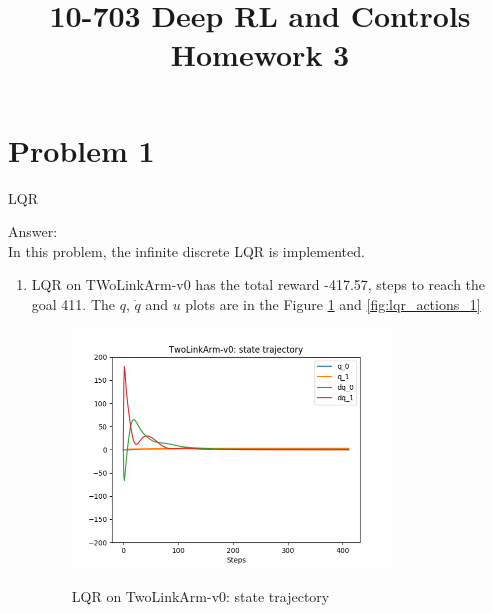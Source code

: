 \documentclass[12pt]{article}
\title{10-703 Deep RL and Controls\\
  Homework 3\\
}
\begin{document}
\maketitle





\section*{Problem 1}
LQR
\begin{tcolorbox}	
	Answer: \\
	In this problem, the infinite discrete LQR is implemented. 
	\begin{enumerate}
	\item
	LQR on TWoLinkArm-v0 has the total reward -417.57, steps to reach the goal 411. The $q$, $\dot{q}$ and $u$ plots are in the Figure \ref{fig:lqr_states_1} and \ref{fig:lqr_actions_1}
	
	\begin{figure}[H]
	\caption{LQR on TwoLinkArm-v0: state trajectory}	
	\centering
	\includegraphics[width=0.8\textwidth]{lqr_1_states.png}
	\label{fig:lqr_states_1}
	\end{figure}
	

\end{enumerate}
\end{tcolorbox}
\end{document}
